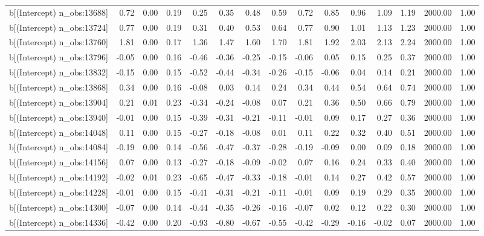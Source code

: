 \begin{table}[ht]
\begin{tabular}{rrrrrrrrrrrrrrr}
  b[(Intercept) n\_obs:13688] & 0.72 & 0.00 & 0.19 & 0.25 & 0.35 & 0.48 & 0.59 & 0.72 & 0.85 & 0.96 & 1.09 & 1.19 & 2000.00 & 1.00 \\ 
  b[(Intercept) n\_obs:13724] & 0.77 & 0.00 & 0.19 & 0.31 & 0.40 & 0.53 & 0.64 & 0.77 & 0.90 & 1.01 & 1.13 & 1.23 & 2000.00 & 1.00 \\ 
  b[(Intercept) n\_obs:13760] & 1.81 & 0.00 & 0.17 & 1.36 & 1.47 & 1.60 & 1.70 & 1.81 & 1.92 & 2.03 & 2.13 & 2.24 & 2000.00 & 1.00 \\ 
  b[(Intercept) n\_obs:13796] & -0.05 & 0.00 & 0.16 & -0.46 & -0.36 & -0.25 & -0.15 & -0.06 & 0.05 & 0.15 & 0.25 & 0.37 & 2000.00 & 1.00 \\ 
  b[(Intercept) n\_obs:13832] & -0.15 & 0.00 & 0.15 & -0.52 & -0.44 & -0.34 & -0.26 & -0.15 & -0.06 & 0.04 & 0.14 & 0.21 & 2000.00 & 1.00 \\ 
  b[(Intercept) n\_obs:13868] & 0.34 & 0.00 & 0.16 & -0.08 & 0.03 & 0.14 & 0.24 & 0.34 & 0.44 & 0.54 & 0.64 & 0.74 & 2000.00 & 1.00 \\ 
  b[(Intercept) n\_obs:13904] & 0.21 & 0.01 & 0.23 & -0.34 & -0.24 & -0.08 & 0.07 & 0.21 & 0.36 & 0.50 & 0.66 & 0.79 & 2000.00 & 1.00 \\ 
  b[(Intercept) n\_obs:13940] & -0.01 & 0.00 & 0.15 & -0.39 & -0.31 & -0.21 & -0.11 & -0.01 & 0.09 & 0.17 & 0.27 & 0.36 & 2000.00 & 1.00 \\ 
  b[(Intercept) n\_obs:14048] & 0.11 & 0.00 & 0.15 & -0.27 & -0.18 & -0.08 & 0.01 & 0.11 & 0.22 & 0.32 & 0.40 & 0.51 & 2000.00 & 1.00 \\ 
  b[(Intercept) n\_obs:14084] & -0.19 & 0.00 & 0.14 & -0.56 & -0.47 & -0.37 & -0.28 & -0.19 & -0.09 & 0.00 & 0.09 & 0.18 & 2000.00 & 1.00 \\ 
  b[(Intercept) n\_obs:14156] & 0.07 & 0.00 & 0.13 & -0.27 & -0.18 & -0.09 & -0.02 & 0.07 & 0.16 & 0.24 & 0.33 & 0.40 & 2000.00 & 1.00 \\ 
  b[(Intercept) n\_obs:14192] & -0.02 & 0.01 & 0.23 & -0.65 & -0.47 & -0.33 & -0.18 & -0.01 & 0.14 & 0.27 & 0.42 & 0.57 & 2000.00 & 1.00 \\ 
  b[(Intercept) n\_obs:14228] & -0.01 & 0.00 & 0.15 & -0.41 & -0.31 & -0.21 & -0.11 & -0.01 & 0.09 & 0.19 & 0.29 & 0.35 & 2000.00 & 1.00 \\ 
  b[(Intercept) n\_obs:14300] & -0.07 & 0.00 & 0.14 & -0.44 & -0.35 & -0.26 & -0.16 & -0.07 & 0.02 & 0.12 & 0.22 & 0.30 & 2000.00 & 1.00 \\ 
  b[(Intercept) n\_obs:14336] & -0.42 & 0.00 & 0.20 & -0.93 & -0.80 & -0.67 & -0.55 & -0.42 & -0.29 & -0.16 & -0.02 & 0.07 & 2000.00 & 1.00 \\ 

\end{tabular}
\end{table}
